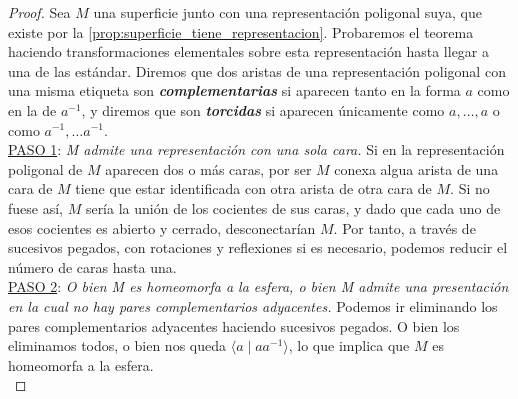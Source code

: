 \documentclass[10pt]{report}
\newcommand{\enfatiza}[1]{\textbf{\textit{#1}}}
\theoremstyle{definition}
\begin{document}
\begin{proof}
Sea $M$ una superficie junto con una representación poligonal suya, que existe por la \autoref{prop:superficie_tiene_representacion}. Probaremos el teorema haciendo transformaciones elementales sobre esta representación hasta llegar a una de las estándar.
Diremos que dos aristas de una representación poligonal con una misma etiqueta son \enfatiza{complementarias} si aparecen tanto en la forma $a$ como en la de $a^{-1}$, y diremos que son \enfatiza{torcidas} si aparecen únicamente como $a,\dots ,a$ o como $a^{-1},\dots a^{-1}$. \\

\underline{PASO 1}: \textit{M admite una representación con una sola cara.} Si en la representación poligonal de $M$ aparecen dos o más caras, por ser $M$ conexa algua arista de una cara de $M$ tiene que estar identificada con otra arista de otra cara de $M$. Si no fuese así, $M$ sería la unión de los cocientes de sus caras, y dado que cada uno de esos cocientes es abierto y cerrado, desconectarían $M$. Por tanto, a través de sucesivos pegados, con rotaciones y reflexiones si es necesario, podemos reducir el número de caras hasta una.\\

\underline{PASO 2}: \textit{O bien M es homeomorfa a la esfera, o bien M admite una presentación en la cual no hay pares complementarios adyacentes.} Podemos ir eliminando los pares complementarios adyacentes haciendo sucesivos pegados. O bien los eliminamos todos, o bien nos queda $\langle a\mid aa^{-1}\rangle$, lo que implica que $M$ es homeomorfa a la esfera.\\


\end{proof}
\end{document}
